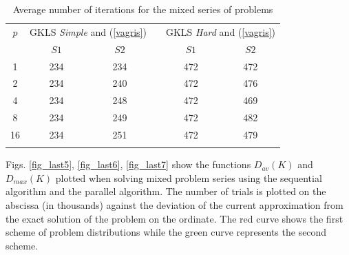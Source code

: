 \documentclass[smallcondensed]{svjour3}     %
\begin{document}
\begin{table}
	\caption{Average number of iterations for the mixed series of problems}
	\label{tab:3}
	\center
	\begin{tabular}{cccccc}
		\hline\noalign{\smallskip}
		$p$ & \multicolumn{2}{c}{ GKLS \textit{Simple} and (\ref{vagris}) } & & \multicolumn{2}{c}{GKLS \textit{Hard} and (\ref{vagris})} \\
		\noalign{\smallskip} \cline{2-3} \cline{5-6} \noalign{\smallskip}
		 & $S1$ & $S2$ & & $S1$ & $S2$ \\
		\noalign{\smallskip} \hline \noalign{\smallskip}
1	&	234	&	234	&	&	472	&	472	\\
2	&	234	&	240	&	&	472	&	476	\\
4	&	234	&	248	&	&	472	&	469	\\
8	&	234	&	249	&	&	472	&	482	\\
16	&	234	&	251	&	&	472	&	479	\\
		\noalign{\smallskip}\hline
	\end{tabular}
\end{table}


Figs. \ref{fig_last5}, \ref{fig_last6}, \ref{fig_last7} show the functions $D_{av}(K)$ and $D_{max}(K)$ plotted when solving mixed problem series using the sequential algorithm and the parallel algorithm. The number of trials is plotted on the abscissa (in thousands) against the deviation of the current approximation from the exact solution of the problem on the ordinate. The red curve shows the first scheme of problem distributions while the green curve represents the second scheme.
\end{document}
